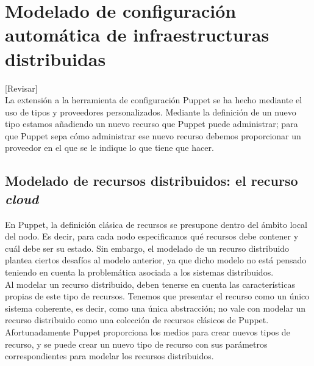 \chapter{Modelado de configuración automática de infraestructuras distribuidas}
\label{cap:modelado}

[Revisar]\\

La extensión a la herramienta de configuración Puppet se ha hecho mediante el uso de tipos y proveedores personalizados. Mediante la definición de un nuevo tipo estamos añadiendo un nuevo recurso que Puppet puede administrar; para que Puppet sepa cómo administrar ese nuevo recurso debemos proporcionar un proveedor en el que se le indique lo que tiene que hacer.


\section{Modelado de recursos distribuidos: el recurso \emph{cloud}}

En Puppet, la definición clásica de recursos se presupone dentro del ámbito local del nodo. Es decir, para cada nodo especificamos qué recursos debe contener y cuál debe ser su estado. Sin embargo, el modelado de un recurso distribuido plantea ciertos desafíos al modelo anterior, ya que dicho modelo no está pensado teniendo en cuenta la problemática asociada a los sistemas distribuidos. \\


Al modelar un recurso distribuido, deben tenerse en cuenta las características propias de este tipo de recursos. Tenemos que presentar el recurso como un único sistema coherente, es decir, como una única abstracción; no vale con modelar un recurso distribuido como una colección de recursos clásicos de Puppet. Afortunadamente Puppet proporciona los medios para crear nuevos tipos de recurso, y se puede crear un nuevo tipo de recurso con sus parámetros correspondientes para modelar los recursos distribuidos. \\

